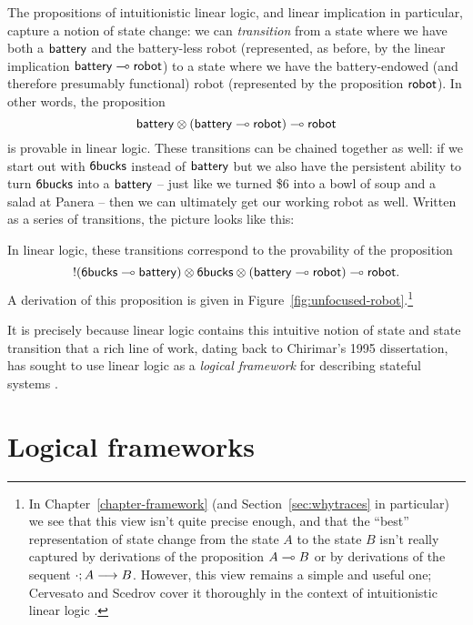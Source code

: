 The propositions of intuitionistic linear logic, and linear implication
in particular, capture a notion of state change: we can {\it
  transition} from a state where we have both a ${\sf battery}$ and
the battery-less robot (represented, as before, by the linear
implication ${\sf battery} \multimap {\sf robot}$) to a state where we
have the battery-endowed (and therefore presumably functional) robot
(represented by the proposition ${\sf robot}$). In other words, the
proposition
%
\[{\sf battery} \otimes ({\sf battery} \multimap {\sf robot}) \multimap
{\sf robot}\] 
%
is provable in linear logic. These transitions can be chained
together as well: if we start out with ${\sf
  6bucks}$ instead of ${\sf battery}$ but we also have the
persistent ability to turn ${\sf 6bucks}$ into a ${\sf battery}$ --
just like we turned \$6 into a bowl of soup and a salad at Panera --
then we can ultimately get our working robot as well.
Written as a series of transitions, the picture looks like this:

In linear logic, these transitions correspond to the provability
of the proposition
\[{!}({\sf 6bucks} \multimap {\sf battery}) \otimes {\sf 6bucks} \otimes
({\sf battery} \multimap {\sf robot}) \multimap {\sf robot}.\] A derivation
of this proposition is given in
Figure~\ref{fig:unfocused-robot}.\footnote{In
  Chapter~\ref{chapter-framework} (and Section~\ref{sec:whytraces} in
  particular) we see that this view isn't quite precise enough, and
  that the ``best'' representation of state change from the state
  $A$ to the state $B$ isn't really captured by derivations of the
  proposition $A \multimap B$ or by derivations of the sequent
  ${\cdot};{A} \longrightarrow {B} \mathstrut$.  However, this view remains a simple and useful
  one; Cervesato and Scedrov cover it thoroughly in the context of
  intuitionistic linear logic \cite{cervesato09relating}.}



It is precisely because linear logic contains this intuitive notion of
state and state transition that a rich line of work, dating back to
Chirimar's 1995 dissertation, has sought to use linear logic as a {\it
  logical framework} for describing stateful systems
\cite{chirimar95proof,cervesato02linear,
  cervesato02concurrent,pfenning04substructural,miller09formalizing,
  pfenning09substructural,cervesato09relating}.  

\section{Logical frameworks}
\label{sec:linlogicalframeworks}

